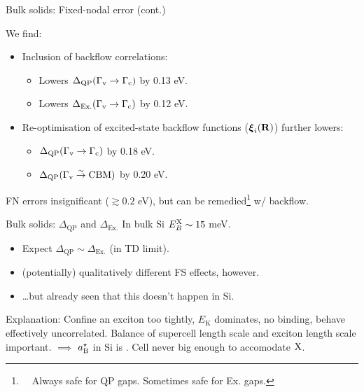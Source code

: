 \documentclass[12pt, pdf, hyperref={draft}, usenames, dvipsnames]{beamer}
\newcommand{\red}[1]{{\bf\color{LancsRed}{#1}}}
\newcommand{\blue}[1]{{\bf\color{NavyBlue}{#1}}}
\begin{document}
\begin{frame}{Bulk solids: Fixed-nodal error (cont.)}
\begin{block}{We find:}
 \begin{itemize}
   \item Inclusion of backflow correlations:
   \begin{itemize}
     \item Lowers $\Delta_{\text{QP}}(\Gamma_{\rm v} \rightarrow \Gamma_{\rm
     c})$ by 0.13 eV.
     \item Lowers $\Delta_{\text{Ex.}}(\Gamma_{\rm v} \rightarrow \Gamma_{\rm
     c})$ by 0.12 eV.
   \end{itemize}
   \item Re-optimisation of excited-state backflow functions (${\boldsymbol
   \xi}_i({\bf R})$) further lowers:
   \begin{itemize}
     \item $\Delta_{\text{QP}}(\Gamma_{\rm v} \rightarrow \Gamma_{\rm
     c})$ by 0.18 eV.
     \item $\Delta_{\text{QP}}(\Gamma_{\rm v} \overset{\sim}{\rightarrow}
  \text{CBM})$ by 0.20 eV.
   \end{itemize}
 \end{itemize}
\end{block}
 \vfill
 \red{Point:} FN errors \red{not} insignificant ($\gtrsim 0.2$ eV), but can be
 remedied\footnote{~~Always safe for QP gaps. Sometimes safe for Ex. gaps.} w/ backflow.
\end{frame}

\begin{frame}{Bulk solids: $\Delta_{\text{QP}}$ and $\Delta_{\text{Ex.}}$}
In bulk Si $E^{\rm X}_B \sim 15$ meV.
\begin{itemize}
  \item Expect $\Delta_{\text{QP}} \sim \Delta_{\text{Ex.}}$ (in TD limit).
  \item (potentially) qualitatively different FS effects, however.
  \item \ldots but already seen that this doesn't happen in Si.
\end{itemize}
\vfill
\begin{block}{Explanation:}
  Confine an exciton too tightly, $E_{\text{K}}$ dominates, no binding, behave
  effectively uncorrelated. Balance of supercell length scale and exciton
  length scale important.
\vfill
  $\implies$ $a^{\star}_{\rm B}$ in Si is \blue{huge}. Cell never big enough to
  accomodate ${\rm X}$.
\end{block}
\end{frame}
\end{document}

